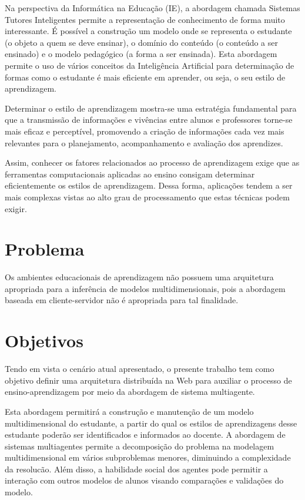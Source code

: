 Na perspectiva da Informática na Educação (IE), a abordagem chamada Sistemas Tutores Inteligentes permite a representação de conhecimento de forma muito interessante. É possível a construção um modelo onde se representa o estudante (o objeto a quem se deve ensinar), o domínio do conteúdo (o conteúdo a ser ensinado) e o modelo pedagógico (a forma a ser ensinada). Esta abordagem permite o uso de vários conceitos da Inteligência Artificial para determinação de formas como o estudante é mais eficiente em aprender, ou seja, o seu estilo de aprendizagem. 

Determinar o estilo de aprendizagem mostra-se uma estratégia fundamental para que a transmissão de informações e vivências entre alunos e professores torne-se mais eficaz e perceptível, promovendo a criação de informações cada vez mais relevantes para o planejamento, acompanhamento e avaliação dos aprendizes.

Assim, conhecer os fatores relacionados ao processo de aprendizagem exige que as ferramentas computacionais aplicadas ao ensino consigam determinar eficientemente os estilos de aprendizagem. Dessa forma, aplicações tendem a ser mais complexas vistas ao alto grau de processamento que estas técnicas podem exigir.

\section{Problema}
Os ambientes educacionais de aprendizagem não possuem uma arquitetura apropriada para a inferência de modelos multidimensionais, pois a abordagem baseada em cliente-servidor não é apropriada para tal finalidade.

\section{Objetivos}
Tendo em vista o cenário atual apresentado, o presente trabalho tem como objetivo definir uma arquitetura distribuída na Web para auxiliar o processo de ensino-aprendizagem por meio da abordagem de sistema multiagente. 

Esta abordagem permitirá a construção e manutenção de um modelo multidimensional do estudante, a partir do qual os estilos de aprendizagens desse estudante poderão ser identificados e informados ao docente. A abordagem de sistemas multiagentes permite a decomposição do problema na modelagem multidimensional em vários subproblemas menores, diminuindo a complexidade da resolucão. Além disso, a habilidade social dos agentes pode permitir a interação com outros modelos de alunos visando comparações e validações do modelo.

